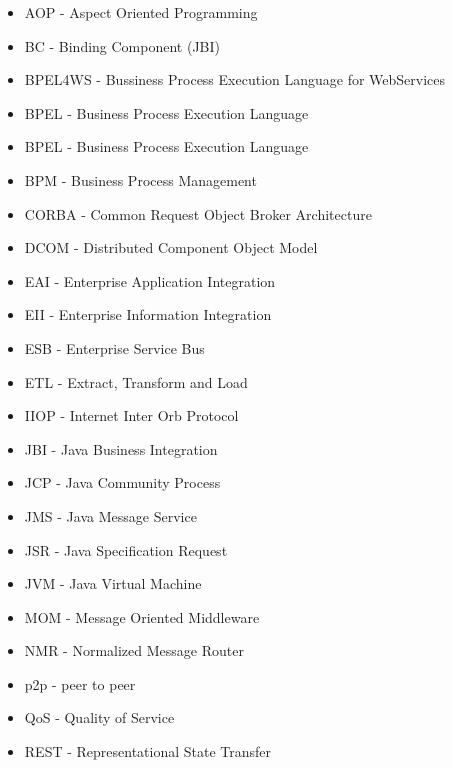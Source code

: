 \begin{itemize}
 
 \item AOP - Aspect Oriented Programming
\item BC - Binding Component (JBI)
\item BPEL4WS - Bussiness Process Execution Language for WebServices
\item BPEL - Business Process Execution Language
\item BPEL - Business Process Execution Language
\item BPM - Business Process Management
\item CORBA - Common Request Object Broker Architecture
\item DCOM - Distributed Component Object Model
\item EAI - Enterprise Application Integration
\item EII - Enterprise Information Integration
\item ESB - Enterprise Service Bus
\item ETL - Extract, Transform and Load
\item IIOP - Internet Inter Orb Protocol
\item JBI - Java Business Integration
\item JCP - Java Community Process
\item JMS - Java Message Service
\item JSR - Java Specification Request
\item JVM - Java Virtual Machine
\item MOM - Message Oriented Middleware
\item NMR - Normalized Message Router
\item p2p - peer to peer
\item QoS - Quality of Service
\item REST - Representational State Transfer

\end{itemize}
